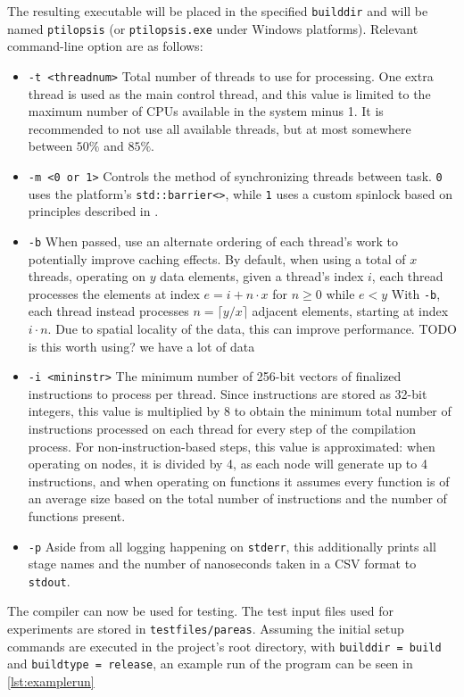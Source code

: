 \documentclass[11pt,dvipsnames]{article}
\newcommand{\helpme}[1]{{\color{red}#1}}
\newcommand{\icpp}[1]{\texttt{#1}}
\newcommand{\mono}[1]{\texttt{#1}}
\begin{document}
The resulting executable will be placed in the specified \mono{builddir} and will be named \mono{ptilopsis} (or \mono{ptilopsis.exe} under Windows platforms). Relevant command-line option are as follows:
\begin{itemize}
    \item \mono{-t <threadnum>} Total number of threads to use for processing.
        One extra thread is used as the main control thread, and this value is limited to the maximum number of CPUs available in the system minus 1. It is recommended to not use all available threads, but at most somewhere between $50\%$ and $85\%$.
    \item \mono{-m <0 or 1>} Controls the method of synchronizing threads between task. \mono{0} uses the platform's \icpp{std::barrier<>}, while \mono{1} uses a custom spinlock based on principles described in \cite{spinlock}.
    \item \mono{-b} When passed, use an alternate ordering of each thread's work to potentially improve caching effects.
    By default, when using a total of $x$ threads, operating on $y$ data elements, given a thread's index $i$, each thread processes the elements at index $e = i + n \cdot x$ for $n \geq 0$ while $e < y$
    With \mono{-b}, each thread instead processes $n = \lceil y / x \rceil$ adjacent elements, starting at index $i \cdot n$. Due to spatial locality of the data, this can improve performance.
    \helpme{TODO is this worth using? we have a lot of data}
    \item \mono{-i <mininstr>} The minimum number of 256-bit vectors of finalized instructions to process per thread. Since instructions are stored as 32-bit integers, this value is multiplied by 8 to obtain the minimum total number of instructions processed on each thread for every step of the compilation process. For non-instruction-based steps, this value is approximated: when operating on nodes, it is divided by 4, as each node will generate up to 4 instructions, and when operating on functions it assumes every function is of an average size based on the total number of instructions and the number of functions present.
    \item \mono{-p} Aside from all logging happening on \mono{stderr}, this additionally prints all stage names and the number of nanoseconds taken in a CSV format to \mono{stdout}.
\end{itemize}

The compiler can now be used for testing. The test input files used for experiments are stored in \mono{testfiles/pareas}. Assuming the initial setup commands are executed in the project's root directory, with  \mono{builddir = build} and \mono{buildtype = release}, an example run of the program can be seen in \autoref{lst:examplerun}
\end{document}
